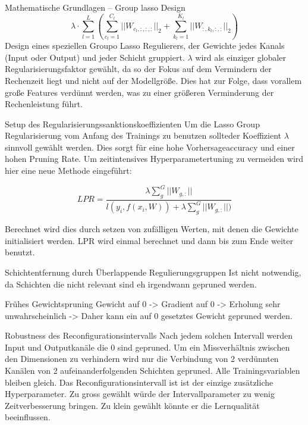 \documentclass[10pt]{beamer}
\begin{document}
\begin{frame}{Mathematische Grundlagen -- Group lasso Design}
$$ \lambda \cdot \sum_{l=1}^{L} \left( \sum_{c_l=1}^{C_l} || W_{c_l,:,:,:} ||_2 + \sum_{k_l=1}^{K_l} || W_{:,k_l,:,:}||_2 \right) $$ 
Design eines speziellen Groupo Lasso Regulierers, der Gewichte jedes Kanals (Input oder Output) und jeder Schicht gruppiert. $\lambda$ wird als einziger globaler Regularisierungsfaktor gewählt, da so der Fokus auf dem Vermindern der Rechenzeit liegt und nicht auf der Modellgröße. Dies hat zur Folge, dass vorallem große Features verdünnt werden, was zu einer größeren Verminderung der Rechenleistung führt.
\end{frame}


\begin{frame}{Setup des Regularisierungssanktionskoeffizienten}
 Um die Lasso Group Regularisierung vom Anfang des Trainings zu benutzen sollteder Koeffizient $\lambda$ sinnvoll gewählt werden. Dies sorgt für eine hohe Vorhersageaccuracy und einer hohen Pruning Rate. Um zeitintensives Hyperparametertuning zu vermeiden wird hier eine neue Methode eingeführt:
 
 $$LPR=\frac{\lambda \sum_{g}^{G}|| W_{g,:} ||}{l(y_i,f(x_i,W))+\lambda \sum_{g}^{G}||W_{g,:} ||)} $$
 
 Berechnet wird dies durch setzen von zufälligen Werten, mit denen die Gewichte initialisiert werden. LPR wird einmal berechnet und dann bis zum Ende weiter benutzt.
\end{frame}


\begin{frame}{Schichtentfernung durch Überlappende Regulierungsgruppen}
 Ist nicht notwendig, da Schichten die nicht relevant sind eh irgendwann gepruned werden.
\end{frame}

\begin{frame}{Frühes Gewichtspruning}
 Gewicht auf 0 -> Gradient auf 0 -> Erholung sehr unwahrscheinlich -> Daher kann ein auf 0 gesetztes Gewicht gepruned werden.
\end{frame}



\begin{frame}{Robustness des Reconfigurationsintervalls}
 Nach jedem solchen Intervall werden Input und Outputkanäle die 0 sind gepruned. Um ein Missverhältnis zwischen den Dimensionen zu verhindern wird nur die Verbindung von 2 verdünnten Kanälen von 2 aufeinanderfolgenden Schichten gepruned. Alle Trainingsvariablen bleiben gleich.
 Das Reconfigurationsintervall ist ist der einzige zusätzliche Hyperparameter. Zu gross gewählt würde der Intervallparameter zu wenig Zeitverbesserung bringen. Zu klein gewählt könnte er die Lernqualität beeinflussen.
\end{frame}
\end{document}
